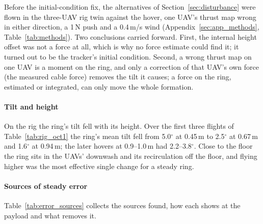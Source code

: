Before the initial-condition fix, the alternatives of Section~\ref{sec:disturbance} were flown in the
three-UAV rig twin against the hover, one UAV's thrust map wrong in either direction, a 1\,N push and a
0.4\,m/s wind (Appendix~\ref{sec:app_methods}, Table~\ref{tab:methods}). Two conclusions carried forward.
First, the internal height offset was not a force at all, which is why no force estimate could find it; it
turned out to be the tracker's initial condition. Second, a wrong thrust map on one UAV is a moment on the
ring, and only a correction of that UAV's own force (the measured cable force) removes the tilt it causes;
a force on the ring, estimated or integrated, can only move the whole formation.

\paragraph{Tilt and height}
\label{sec:res_tilt}

On the rig the ring's tilt fell with its height. Over the first three flights of
Table~\ref{tab:rig_oct1} the ring's mean tilt fell from
5.0$^\circ$ at 0.45\,m to 2.5$^\circ$ at 0.67\,m and 1.6$^\circ$ at 0.94\,m; the later hovers at
0.9--1.0\,m had 2.2--3.8$^\circ$. Close to the floor the ring sits in the UAVs' downwash and its
recirculation off the floor, and flying higher was the most effective single change for a steady
ring.

\paragraph{Sources of steady error}

Table~\ref{tab:error_sources} collects the sources found, how each shows at the payload and what
removes it.

